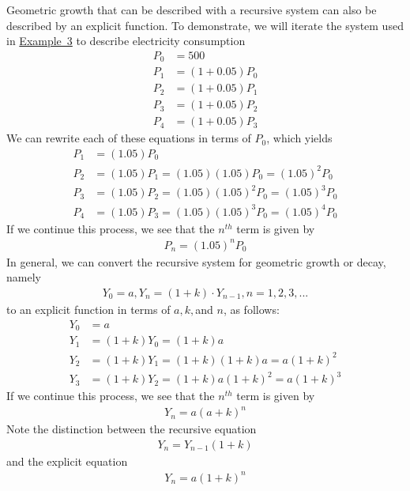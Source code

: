 \documentclass[10pt,]{book}
\theoremstyle{ptxdefinitionnotitle}
\theoremstyle{ptxdefinitiontitle}
\theoremstyle{ptxdefinitionnotitle}
\theoremstyle{ptxdefinitiontitle}
\theoremstyle{ptxdefinitionnotitle}
\theoremstyle{ptxdefinitiontitle}
\numberwithin{equation}{section}
\begin{document}
\hypertarget{p-82}{}%
Geometric growth that can be described with a recursive system can also be described by an explicit function.  To demonstrate, we will iterate the system used in \hyperref[example-radioactive-decay]{Example~3} to describe electricity consumption%
%
\begin{align*}
P_0&=500\\
P_1&=(1+0.05)P_0\\
P_2&=(1+0.05)P_1\\
P_3&=(1+0.05)P_2\\
P_4&=(1+0.05)P_3
\end{align*}
\hypertarget{p-83}{}%
We can rewrite each of these equations in terms of \(P_0\), which yields%
%
\begin{align*}
P_1&=(1.05)P_0\\
P_2&=(1.05) P_1=(1.05) (1.05)P_0=(1.05)^2 P_0\\
P_3&=(1.05) P_2=(1.05) (1.05)^2 P_0=(1.05)^3 P_0\\
P_4&=(1.05) P_3=(1.05) (1.05)^3 P_0=(1.05)^4 P_0
\end{align*}
\hypertarget{p-84}{}%
If we continue this process, we see that the \(n^{th}\) term is given by%
%
\begin{gather*}
P_n=(1.05)^n P_0
\end{gather*}
\hypertarget{p-85}{}%
In general, we can convert the recursive system for geometric growth or decay, namely%
%
\begin{gather*}
Y_0=a,Y_n=(1+k) \cdot Y_{n-1}, n=1,2,3, ...
\end{gather*}
\hypertarget{p-86}{}%
to an explicit function in terms of \(a, k, \)and \(n\), as follows:%
%
\begin{align*}
Y_0&=a\\
Y_1&=(1+k)Y_0 = (1+k)a\\
Y_2&=(1+k)Y_1 = (1+k)(1+k)a = a(1+k)^2\\
Y_3&=(1+k)Y_2 = (1+k)a(1+k)^2 = a(1+k)^3
\end{align*}
\hypertarget{p-87}{}%
If we continue this process, we see that the \(n^{th}\) term is given by%
%
\begin{gather*}
Y_n=a(a+k)^n
\end{gather*}
\hypertarget{p-88}{}%
Note the distinction between the recursive equation%
%
\begin{gather*}
Y_n=Y_{n-1}(1+k)
\end{gather*}
\hypertarget{p-89}{}%
and the explicit equation%
%
\begin{gather*}
Y_n=a(1+k)^n
\end{gather*}
\end{document}
